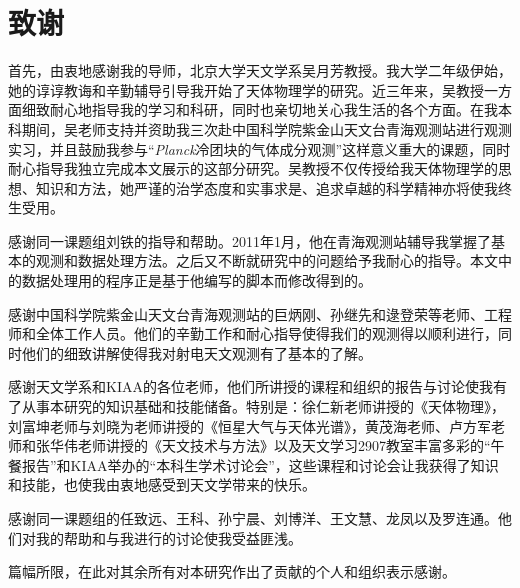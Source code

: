 %

\chapter{致谢}

首先，由衷地感谢我的导师，北京大学天文学系吴月芳教授。我大学二年级伊始，她的谆谆教诲和辛勤辅导引导我开始了天体物理学的研究。近三年来，吴教授一方面细致耐心地指导我的学习和科研，同时也亲切地关心我生活的各个方面。在我本科期间，吴老师支持并资助我三次赴中国科学院紫金山天文台青海观测站进行观测实习，并且鼓励我参与“\emph{Planck}冷团块的气体成分观测”这样意义重大的课题，同时耐心指导我独立完成本文展示的这部分研究。吴教授不仅传授给我天体物理学的思想、知识和方法，她严谨的治学态度和实事求是、追求卓越的科学精神亦将使我终生受用。

感谢同一课题组刘铁的指导和帮助。2011年1月，他在青海观测站辅导我掌握了基本的观测和数据处理方法。之后又不断就研究中的问题给予我耐心的指导。本文中的数据处理用的程序正是基于他编写的脚本而修改得到的。

感谢中国科学院紫金山天文台青海观测站的巨炳刚、孙继先和逯登荣等老师、工程师和全体工作人员。他们的辛勤工作和耐心指导使得我们的观测得以顺利进行，同时他们的细致讲解使得我对射电天文观测有了基本的了解。

感谢天文学系和KIAA的各位老师，他们所讲授的课程和组织的报告与讨论使我有了从事本研究的知识基础和技能储备。特别是：徐仁新老师讲授的《天体物理》，刘富坤老师与刘晓为老师讲授的《恒星大气与天体光谱》，黄茂海老师、卢方军老师和张华伟老师讲授的《天文技术与方法》以及天文学习2907教室丰富多彩的“午餐报告”和KIAA举办的“本科生学术讨论会”，这些课程和讨论会让我获得了知识和技能，也使我由衷地感受到天文学带来的快乐。

感谢同一课题组的任致远、王科、孙宁晨、刘博洋、王文慧、龙凤以及罗连通。他们对我的帮助和与我进行的讨论使我受益匪浅。

篇幅所限，在此对其余所有对本研究作出了贡献的个人和组织表示感谢。
